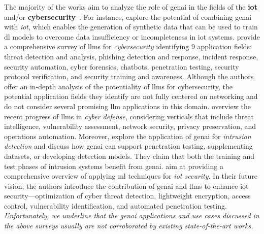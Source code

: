The majority of the works aim to analyze the role of \gls{genai} in the fields of the \textbf{\gls{iot}} and/or \textbf{cybersecurity}~\cite{sai2024empowering, ferrag2024generative, hassanin2024comprehensive, halvorsen2024applying, alwahedi2024ml}.
For instance, \citet{sai2024empowering}
explore the potential of combining \gls{genai} with \emph{\gls{iot}}, which enables the generation of synthetic data that can be used to train \gls{dl} models to overcome data insufficiency or incompleteness in \gls{iot} systems.
\citet{ferrag2024generative} provide a comprehensive survey of \glspl{llm} for \emph{cybersecurity} identifying $9$ application fields:
threat detection and analysis, 
phishing detection and response, 
incident response, 
security automation, 
cyber forensics, 
chatbots, 
penetration testing, 
security protocol verification, and 
security training and awareness.
Although the authors offer an in-depth analysis of the potentiality of \glspl{llm} for cybersecurity,
the potential application fields they identify
are not fully centered on networking
and do not consider several promising \gls{llm} applications in this domain.
\citet{hassanin2024comprehensive}
overview the recent progress of \glspl{llm} in \emph{cyber defense},
considering verticals that include threat intelligence, vulnerability assessment, network security, privacy preservation, and operations automation.
Moreover, \citet{halvorsen2024applying} explore the application of \gls{genai} for \emph{intrusion detection} and
discuss how \gls{genai} can support 
penetration testing, supplementing datasets, or developing 
detection models.
They claim that both the training and test phases of intrusion systems benefit from \gls{genai}.
\citet{alwahedi2024ml} aim at providing a comprehensive overview of applying \gls{ml} techniques for \emph{\gls{iot} security}.
In their future vision, the authors 
introduce the contribution of
\gls{genai} and \glspl{llm} to enhance \gls{iot} security---\eg optimization of cyber threat detection, lightweight encryption, access control, vulnerability identification, and automated penetration testing.
\emph{Unfortunately, we underline that the \gls{genai} applications and use cases discussed in the above surveys usually are not corroborated by existing state-of-the-art works.}


